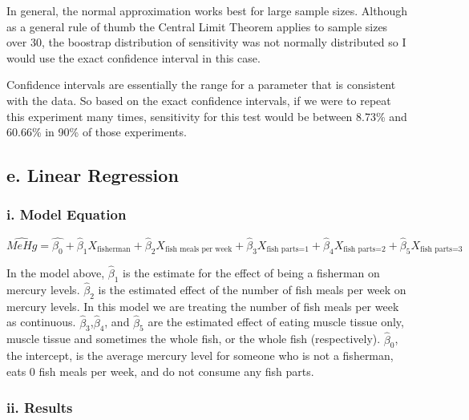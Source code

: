 \documentclass[]{article}
\begin{document}
In general, the normal approximation works best for large sample sizes.
Although as a general rule of thumb the Central Limit Theorem applies to
sample sizes over 30, the boostrap distribution of sensitivity was not
normally distributed so I would use the exact confidence interval in
this case.

Confidence intervals are essentially the range for a parameter that is
consistent with the data. So based on the exact confidence intervals, if
we were to repeat this experiment many times, sensitivity for this test
would be between 8.73\% and 60.66\% in 90\% of those experiments.

\hypertarget{e.-linear-regression}{%
\subsection{e. Linear Regression}\label{e.-linear-regression}}

\hypertarget{i.-model-equation}{%
\subsubsection{i. Model Equation}\label{i.-model-equation}}

\[
\hat{MeHg} = \hat{\beta_0} + \hat{\beta}_1X_{\text{fisherman}}+ \hat{\beta}_2X_{\text{fish meals per week}}+\hat{\beta}_3X_{\text{fish parts=1}}+\hat{\beta}_4X_{\text{fish parts=2}}+\hat{\beta}_5X_{\text{fish parts=3}}
\]

In the model above, \(\hat{\beta}_1\) is the estimate for the effect of
being a fisherman on mercury levels. \(\hat{\beta}_2\) is the estimated
effect of the number of fish meals per week on mercury levels. In this
model we are treating the number of fish meals per week as continuous.
\(\hat{\beta}_3\),\(\hat{\beta}_4\), and \(\hat{\beta}_5\) are the
estimated effect of eating muscle tissue only, muscle tissue and
sometimes the whole fish, or the whole fish (respectively).
\(\hat{\beta}_0\), the intercept, is the average mercury level for
someone who is not a fisherman, eats 0 fish meals per week, and do not
consume any fish parts.

\hypertarget{ii.-results}{%
\subsubsection{ii. Results}\label{ii.-results}}
\end{document}
